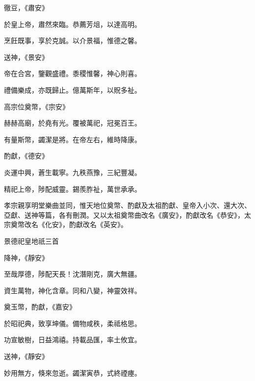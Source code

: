 \begin{pinyinscope}
 徹豆，《肅安》



 於皇上帝，肅然來臨。恭薦芳俎，以達高明。



 烹飪既事，享於克誠。以介景福，惟德之馨。



 送神，《景安》



 帝在合宮，鑒觀盛禮。黍稷惟馨，神心則喜。



 禮備樂成，亦既歸止。億萬斯年，以貺多祉。



 高宗位奠幣，《宗安》



 赫赫高廟，於堯有光。覆被萬祀，冠冕百王。



 有量斯幣，蠲潔是將。在帝左右，維時降康。



 酌獻，《德安》



 炎運中興，蒼生載寧。九秩燕豫，三紀豐凝。



 精祀上帝，陟配威靈。錫羨胙祉，萬世承承。



 孝宗親享明堂樂曲並同，惟天地位奠幣、酌獻及太祖酌獻、皇帝入小次、還大次、亞獻、送神等篇，各有刪潤。又以太祖奠幣曲改名《廣安》，酌獻改名《恭安》，太宗奠幣改名《化安》，酌獻改名《英安》。



 景德祀皇地祇三首



 降神，《靜安》



 至哉厚德，陟配天長！沈潛剛克，廣大無疆。



 資生萬物，神化含章。同和八變，神靈效祥。



 奠玉幣，酌獻，《嘉安》



 於昭祀典，致享坤儀。備物咸秩，柔祗格思。



 功宣敏樹，日益鴻禧。持載品匯，率土攸宜。



 送神，《靜安》



 妙用無方，倏來忽逝。蠲潔寅恭，式終禋瘞。




\end{pinyinscope}
